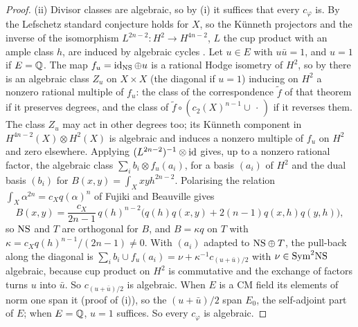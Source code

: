 \begin{proof}
(ii) Divisor classes are algebraic, so by (i) it suffices that every
$c_{\varphi}$ is. By \cite[Theorem~1.1]{CM13} the Lefschetz standard
conjecture holds for $X$, so the K\"unneth projectors and the inverse of the isomorphism
$L^{2n-2}\colon H^{2}\to H^{4n-2}$, $L$ the cup product with an ample class
$h$, are induced by algebraic cycles \cite{Kle68,Kle94}. Let $u\in E$ with
$u\bar u=1$, and $u=1$ if $E=\mathbb{Q}$. The map $f_{u}=\operatorname{id}_{\mathrm{NS}}\oplus u$ is a
rational Hodge isometry of $H^{2}$, so by \cite[Theorem~1.1]{Mar24} there is
an algebraic class $Z_{u}$ on $X\times X$ (the diagonal if $u=1$) inducing on
$H^{2}$ a nonzero rational multiple of $f_{u}$: the class of the
correspondence $\tilde f$ of that theorem if it preserves degrees, and the
class of $\tilde f\circ(c_{2}(X)^{n-1}\cup\,\cdot\,)$ if it reverses them.
The class $Z_{u}$ may act in other degrees too; its K\"unneth component in
$H^{4n-2}(X)\otimes H^{2}(X)$ is algebraic and induces a nonzero multiple of
$f_{u}$ on $H^{2}$ and zero elsewhere. Applying $(L^{2n-2})^{-1}\otimes\operatorname{id}$
gives, up to a nonzero rational factor, the algebraic class
$\sum_{i}b_{i}\otimes f_{u}(a_{i})$, for a basis $(a_{i})$ of $H^{2}$ and
the dual basis $(b_{i})$ for $B(x,y)=\int_{X}xyh^{2n-2}$. Polarising the
relation $\int_{X}\alpha^{2n}=c_{X}q(\alpha)^{n}$ of Fujiki and Beauville
\cite{Bea83,Fuj87} gives
\[
  B(x,y)=\frac{c_{X}}{2n-1}\,q(h)^{n-2}\bigl(q(h)q(x,y)+2(n-1)q(x,h)q(y,h)\bigr),
\]
so $\mathrm{NS}$ and $T$ are orthogonal for $B$, and $B=\kappa q$ on $T$ with
$\kappa=c_{X}q(h)^{n-1}/(2n-1)\ne0$. With $(a_{i})$ adapted to
$\mathrm{NS}\oplus T$, the pull-back along the diagonal is
$\sum_{i}b_{i}\cup f_{u}(a_{i})=\nu+\kappa^{-1}c_{(u+\bar u)/2}$ with
$\nu\in\mathrm{Sym}^{2}\mathrm{NS}$ algebraic, because cup product on $H^{2}$ is
commutative and the exchange of factors turns $u$ into $\bar u$. So
$c_{(u+\bar u)/2}$ is algebraic. When $E$ is a CM field its elements of norm
one span it (proof of (i)), so the $(u+\bar u)/2$ span
$E_{0}$, the self-adjoint part of $E$; when $E=\mathbb{Q}$, $u=1$ suffices. So
every $c_{\varphi}$ is algebraic.


\end{proof}
